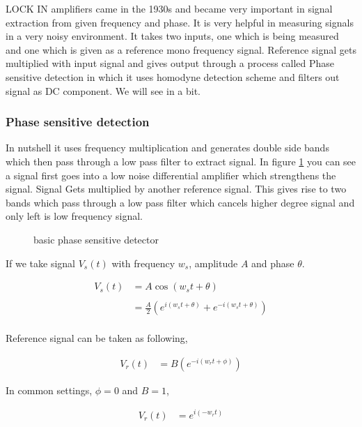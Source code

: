 LOCK IN amplifiers came in the 1930s and became very important in signal extraction from given frequency and phase. It is very helpful in measuring signals in a very noisy environment. It takes two inputs, one which is being measured and one which is given as a reference mono frequency signal. Reference signal gets multiplied with input signal and gives output through a process called Phase sensitive detection in which it uses homodyne detection scheme and filters out signal as DC component. We will see in a bit.\cite{srssr830}\cite{thinksrslockin}\cite{zhistpricipleoflockin}\cite{srssr830m}

\subsubsection{Phase sensitive detection}

In nutshell it uses frequency multiplication and generates double side bands which then pass through a low pass filter to extract signal. In figure \ref{fig:psd} you can see a signal first goes into a low noise differential amplifier which strengthens the signal. Signal Gets multiplied by another reference signal. This gives rise to two bands which pass through a low pass filter which cancels higher degree signal and only left is low frequency signal.


\begin{figure}[hbt!]
\caption{basic phase sensitive detector\label{fig:psd}}
\end{figure}

If we take signal $V_s(t)$ with frequency $w_s$, amplitude $A$ and phase $\theta$. 

\begin{align*}
V_{s}(t) & = A \cos(w_st+\theta)\\
\\
& = \frac{A}{2} (e^{i(w_st+\theta)}+e^{-i(w_st+\theta)})\\
\end{align*}

Reference signal can be taken as following,

\begin{align*}
V_r(t) & = B (e^{-i(w_rt+\phi)})
\end{align*}

In common settings, $\phi = 0$ and $B=1$,

\begin{align*}
V_r(t) & = e^{i(-w_rt)}
\end{align*}

